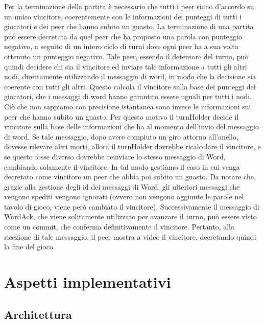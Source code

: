 \documentclass[10.5pt]{article}
\begin{document}
Per la terminazione della partita è necessario che tutti i peer siano d'accordo su un unico vincitore, coerentemente con le informazioni dei punteggi di tutti i giocatori e dei peer che hanno subito un guasto. La terminazione di una partita può essere decretata da quel peer che ha proposto una parola con punteggio negativo, a seguito di un intero ciclo di turni dove ogni peer ha a sua volta ottenuto un punteggio negativo. Tale peer, essendo il detentore del turno, può quindi decidere chi sia il vincitore ed inviare tale informazione a tutti gli altri nodi, direttamente utilizzando il messaggio di word, in modo che la decisione sia coerente con tutti gli altri. Questo calcola il vincitore sulla base dei punteggi dei giocatori, che i messaggi di word hanno garantito essere uguali per tutti i nodi. Ciò che non sappiamo con precisione istantanea sono invece le informazioni sui peer che hanno subito un guasto. Per questo motivo il turnHolder decide il vincitore sulla base delle informazioni che ha al momento dell'invio del messaggio di word. Se tale messaggio, dopo avere compiuto un giro attorno all'anello, dovesse rilevare altri morti, allora il turnHolder dovrebbe ricalcolare il vincitore, e se questo fosse diverso dovrebbe reinviare lo stesso messaggio di Word, cambiando solamente il vincitore. In tal modo gestiamo il caso in cui venga decretato come vincitore un peer che abbia poi subito un guasto. Da notare che, grazie alla gestione degli id dei messaggi di Word, gli ulteriori messaggi che vengono spediti vengono ignorati (ovvero non vengono aggiunte le parole nel tavolo di gioco, viene però cambiato il vincitore). Successivamente il messaggio di WordAck, che viene solitamente utilizzato per avanzare il turno, può essere visto come un commit, che conferma definitivamente il vincitore. Pertanto, alla ricezione di tale messaggio, il peer mostra a video il vincitore, decretando quindi la fine del gioco.

\section{Aspetti implementativi}

\subsection{Architettura}
\end{document}

